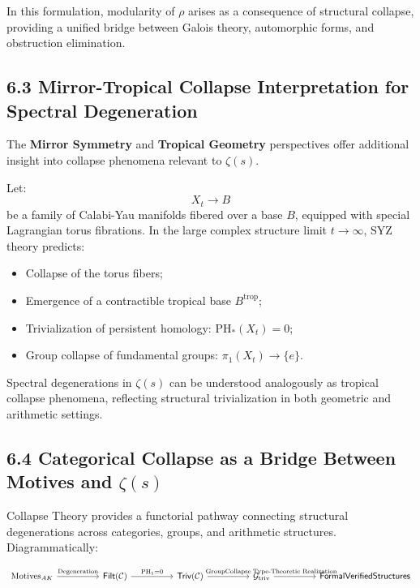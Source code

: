 \documentclass[11pt]{article}
\begin{document}
In this formulation, modularity of $\rho$ arises as a consequence of structural collapse, providing a unified bridge between Galois theory, automorphic forms, and obstruction elimination.

\subsection*{6.3 Mirror-Tropical Collapse Interpretation for Spectral Degeneration}

The \textbf{Mirror Symmetry} and \textbf{Tropical Geometry} perspectives offer additional insight into collapse phenomena relevant to $\zeta(s)$.

Let:
\[
X_t \longrightarrow B
\]
be a family of Calabi-Yau manifolds fibered over a base $B$, equipped with special Lagrangian torus fibrations. In the large complex structure limit $t \to \infty$, SYZ theory predicts:

\begin{itemize}
    \item Collapse of the torus fibers;
    \item Emergence of a contractible tropical base $B^{\mathrm{trop}}$;
    \item Trivialization of persistent homology: $\mathrm{PH}_*(X_t) = 0$;
    \item Group collapse of fundamental groups: $\pi_1(X_t) \longrightarrow \{ e \}$.
\end{itemize}

Spectral degenerations in $\zeta(s)$ can be understood analogously as tropical collapse phenomena, reflecting structural trivialization in both geometric and arithmetic settings.

\subsection*{6.4 Categorical Collapse as a Bridge Between Motives and $\zeta(s)$}

Collapse Theory provides a functorial pathway connecting structural degenerations across categories, groups, and arithmetic structures. Diagrammatically:

\[
\begin{tikzcd}[column sep=huge]
\mathrm{Motives}_{AK} \arrow[r, "\text{Degeneration}"]
& \mathsf{Filt}(\mathcal{C}) \arrow[r, "\mathrm{PH}_1 = 0"]
& \mathsf{Triv}(\mathcal{C}) \arrow[r, "\mathrm{GroupCollapse}"]
& \mathcal{G}_{\mathrm{triv}} \arrow[r, "\text{Type-Theoretic Realization}"]
& \mathsf{Formal Verified Structures}
\end{tikzcd}
\]
\end{document}
